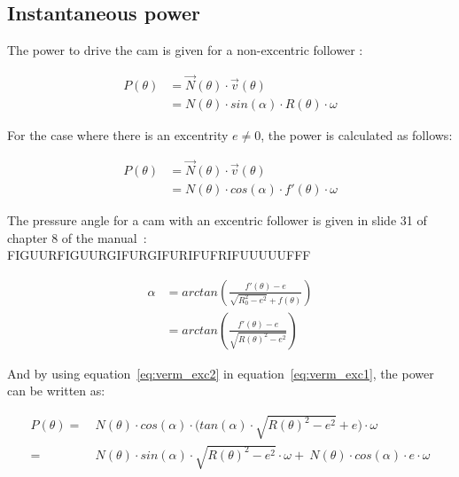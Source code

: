 \documentclass[a4paper]{article}
\begin{document}
\subsection{Instantaneous power}
\label{sec:power}

The power to drive the cam is given for a non-excentric follower \cite{vermogen}:

\begin{equation}
	\begin{split}
	P(\theta) & = \vec{N}(\theta)\cdot\vec{v}(\theta) \\
	&=N(\theta)\cdot sin(\alpha)\cdot R(\theta)\cdot \omega
	\end{split}
\end{equation}

For the case where there is an excentrity \(e\neq0\), the power is calculated as follows:

\begin{equation}
	\begin{split}
	P(\theta) & = \vec{N}(\theta)\cdot\vec{v}(\theta) \\
	&=N(\theta)\cdot cos(\alpha)\cdot f'(\theta)\cdot\omega
	\end{split}
	\label{eq:verm_exc1}
\end{equation}

The pressure angle for a cam with an excentric follower is given in slide 31 of chapter 8 of the manual~\cite{cursus}: FIGUURFIGUURGIFURGIFURIFUFRIFUUUUUFFF

\begin{equation}
	\begin{split}
	\alpha& = arctan\left(\frac{f'(\theta)-e}{\sqrt{R_0^2-e^2}+f(\theta)}\right)\\
	&=arctan\left(\frac{f'(\theta)-e}{\sqrt{R(\theta)^2-e^2}}\right)
	\end{split}
	\label{eq:verm_exc2}
\end{equation}

And by using equation~\ref{eq:verm_exc2} in equation~\ref{eq:verm_exc1}, the power can be written as:

\begin{equation}
	\begin{split}
	P(\theta) =&~ N(\theta)\cdot cos(\alpha)\cdot \Big(tan(\alpha)\cdot\sqrt{R(\theta)^2-e^2}+e\Big)\cdot\omega\\
	=&~N(\theta)\cdot sin(\alpha)\cdot\sqrt{R(\theta)^2-e^2}\cdot\omega  +~N(\theta)\cdot cos(\alpha)\cdot e \cdot\omega
	\end{split}
\end{equation}
\end{document}

